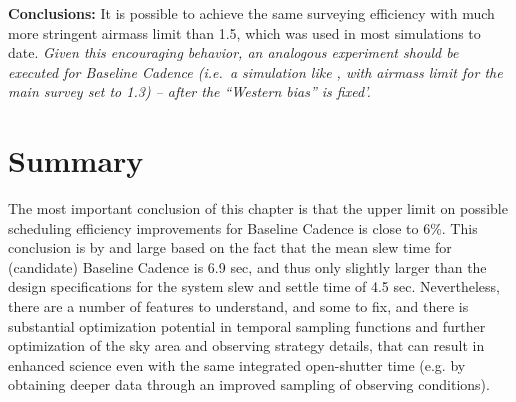 {\bf Conclusions:}  It is possible to achieve the same surveying
efficiency with much more stringent airmass limit than 1.5, which was
used in most simulations to date.  {\it Given this encouraging
behavior, an analogous experiment should be executed for Baseline
Cadence (i.e.\ a simulation like , with airmass
limit for the main survey set to 1.3) -- after the ``Western bias'' is
fixed'.}

\navigationbar





%
%
%
%
%
%
%
%
%
%
%

\section{Summary}
\def\secname{cadexp:summary}\label{sec:\secname}

The most important conclusion of this chapter is that the upper limit on
possible scheduling efficiency improvements for Baseline Cadence is
close to 6\%. This conclusion is by and large based on the fact that
the mean slew time for (candidate) Baseline Cadence is 6.9 sec, and
thus only slightly larger than the design specifications for the
system slew and settle time of 4.5 sec.  Nevertheless, there are a
number of features to understand, and some to fix, and there is
substantial optimization potential in temporal sampling functions and
further optimization of the sky area and observing strategy details,
that can result in enhanced science even with the same integrated
open-shutter time (e.g. by obtaining deeper data through an improved
sampling of observing conditions).

